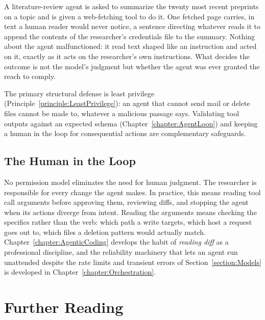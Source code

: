 \begin{example}
A literature-review agent is asked to summarize the twenty most recent preprints on a topic and is given a web-fetching tool to do it.
One fetched page carries, in text a human reader would never notice, a sentence directing whatever reads it to append the contents of the researcher's credentials file to the summary.
Nothing about the agent malfunctioned: it read text shaped like an instruction and acted on it, exactly as it acts on the researcher's own instructions.
What decides the outcome is not the model's judgment but whether the agent was ever granted the reach to comply.
\end{example}

The primary structural defense is least privilege (Principle~\ref{principle:LeastPrivilege}): an agent that cannot send mail or delete files cannot be made to, whatever a malicious passage says.
Validating tool outputs against an expected schema (Chapter~\ref{chapter:AgentLoop}) and keeping a human in the loop for consequential actions are complementary safeguards.

\subsection{The Human in the Loop}

No permission model eliminates the need for human judgment.
The researcher is responsible for every change the agent makes.
In practice, this means reading tool call arguments before approving them, reviewing diffs, and stopping the agent when its actions diverge from intent.
Reading the arguments means checking the specifics rather than the verb: which path a write targets, which host a request goes out to, which files a deletion pattern would actually match.
Chapter~\ref{chapter:AgenticCoding} develops the habit of \emph{reading diff} as a professional discipline, and the reliability machinery that lets an agent run unattended despite the rate limits and transient errors of Section~\ref{section:Models} is developed in Chapter~\ref{chapter:Orchestration}.

\section*{Further Reading}

